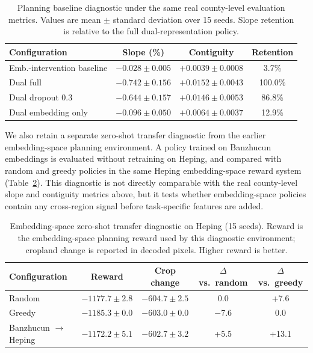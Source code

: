 \documentclass{article}
\begin{document}
\begin{table}[htbp]
\centering
\caption{Planning baseline diagnostic under the same real county-level evaluation metrics. Values are mean $\pm$ standard deviation over 15 seeds. Slope retention is relative to the full dual-representation policy.}
\label{tab:planning_baseline}
\footnotesize
\begin{tabular}{lccc}
\toprule
Configuration & Slope (\%) & Contiguity & Retention \\
\midrule
Emb.-intervention baseline & $-0.028 \pm 0.005$ & $+0.0039 \pm 0.0008$ & 3.7\% \\
Dual full & $-0.742 \pm 0.156$ & $+0.0152 \pm 0.0043$ & 100.0\% \\
Dual dropout 0.3 & $-0.644 \pm 0.157$ & $+0.0146 \pm 0.0053$ & 86.8\% \\
Dual embedding only & $-0.096 \pm 0.050$ & $+0.0064 \pm 0.0037$ & 12.9\% \\
\bottomrule
\end{tabular}
\end{table}

We also retain a separate zero-shot transfer diagnostic from the earlier embedding-space planning environment. A policy trained on Banzhucun embeddings is evaluated without retraining on Heping, and compared with random and greedy policies in the same Heping embedding-space reward system (Table~\ref{tab:transfer_planning}). This diagnostic is not directly comparable with the real county-level slope and contiguity metrics above, but it tests whether embedding-space policies contain any cross-region signal before task-specific features are added.

\begin{table}[htbp]
\centering
\caption{Embedding-space zero-shot transfer diagnostic on Heping (15 seeds). Reward is the embedding-space planning reward used by this diagnostic environment; cropland change is reported in decoded pixels. Higher reward is better.}
\label{tab:transfer_planning}
\footnotesize
\begin{tabular}{lcccc}
\toprule
Configuration & Reward & Crop change & $\Delta$ vs.\ random & $\Delta$ vs.\ greedy \\
\midrule
Random & $-1177.7 \pm 2.8$ & $-604.7 \pm 2.5$ & 0.0 & +7.6 \\
Greedy & $-1185.3 \pm 0.0$ & $-603.0 \pm 0.0$ & $-$7.6 & 0.0 \\
Banzhucun $\to$ Heping & $-1172.2 \pm 5.1$ & $-602.7 \pm 3.2$ & +5.5 & +13.1 \\
\bottomrule
\end{tabular}
\end{table}
\end{document}
